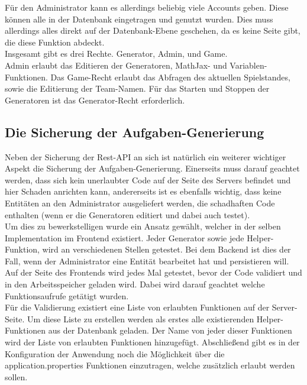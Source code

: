 Für den Administrator kann es allerdings beliebig viele Accounts geben. Diese können alle in der Datenbank eingetragen und genutzt wurden. Dies muss allerdings alles direkt auf der Datenbank-Ebene geschehen, da es keine Seite gibt, die diese Funktion abdeckt. \\

Insgesamt gibt es drei Rechte. Generator, Admin, und Game. \\

Admin erlaubt das Editieren der Generatoren, MathJax- und Variablen-Funktionen. Das Game-Recht erlaubt das Abfragen des aktuellen Spielstandes, sowie die Editierung der Team-Namen. Für das Starten und Stoppen der Generatoren ist das Generator-Recht erforderlich. \\

\subsection{Die Sicherung der Aufgaben-Generierung}\label{GenerateTaskChapter}

Neben der Sicherung der Rest-API an sich ist natürlich ein weiterer wichtiger Aspekt die Sicherung der Aufgaben-Generierung. Einerseits muss darauf geachtet werden, dass sich kein unerlaubter Code auf der Seite des Servers befindet und hier Schaden anrichten kann, andererseits ist es ebenfalls wichtig, dass keine Entitäten an den Administrator ausgeliefert werden, die schadhaften Code enthalten (wenn er die Generatoren editiert und dabei auch testet). \\

Um dies zu bewerkstelligen wurde ein Ansatz gewählt, welcher in der selben Implementation im Frontend existiert. Jeder Generator sowie jede Helper-Funktion, wird an verschiedenen Stellen getestet. Bei dem Backend ist dies der Fall, wenn der Administrator eine Entität bearbeitet hat und persistieren will. Auf der Seite des Frontends wird jedes Mal getestet, bevor der Code validiert und in den Arbeitsspeicher geladen wird. Dabei wird darauf geachtet welche Funktionsaufrufe getätigt wurden. \\

Für die Validierung existiert eine Liste von erlaubten Funktionen auf der Server-Seite. Um diese Liste zu erstellen werden als erstes alle existierenden Helper-Funktionen aus der Datenbank geladen. Der Name von jeder dieser Funktionen wird der Liste von erlaubten Funktionen hinzugefügt. Abschließend gibt es in der Konfiguration der Anwendung noch die Möglichkeit über die application.properties Funktionen einzutragen, welche zusätzlich erlaubt werden sollen. \\

